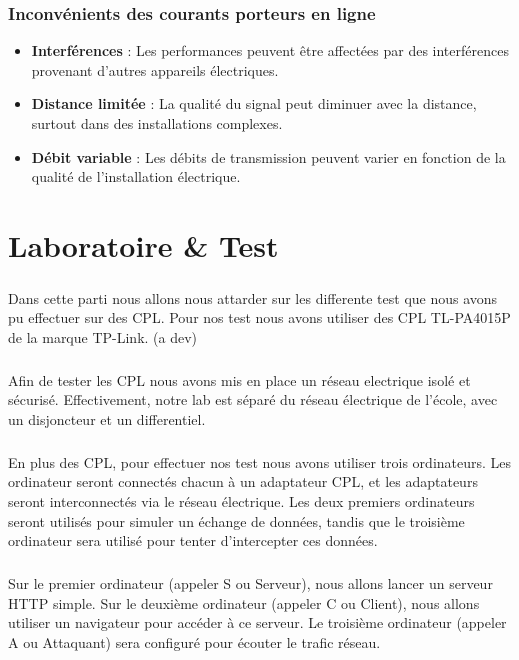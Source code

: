 \documentclass[a4paper,twocolumn]{report}
\begin{document}
\subsection{Inconvénients des courants porteurs en ligne}
\begin{itemize}
    \item \textbf{Interférences} : Les performances peuvent être affectées par des interférences provenant d'autres appareils électriques.
    \item \textbf{Distance limitée} : La qualité du signal peut diminuer avec la distance, surtout dans des installations complexes.
    \item \textbf{Débit variable} : Les débits de transmission peuvent varier en fonction de la qualité de l'installation électrique.
\end{itemize}



\chapter{Laboratoire & Test}
\paragraph{}Dans cette parti nous allons nous attarder sur les differente test que nous avons pu effectuer sur des CPL. Pour nos test nous avons utiliser des CPL TL-PA4015P de la marque TP-Link. (a dev)
\paragraph{}Afin de tester les CPL nous avons mis en place un réseau electrique isolé et sécurisé. Effectivement, notre lab est séparé du réseau électrique de l'école, avec un disjoncteur et un differentiel.
\paragraph{}En plus des CPL, pour effectuer nos test nous avons utiliser trois ordinateurs. Les ordinateur seront connectés chacun à un adaptateur CPL, et les adaptateurs seront interconnectés via le réseau électrique. Les deux premiers ordinateurs seront utilisés pour simuler un échange de données, tandis que le troisième ordinateur sera utilisé pour tenter d'intercepter ces données.
\paragraph{}Sur le premier ordinateur (appeler S ou Serveur), nous allons lancer un serveur HTTP simple. Sur le deuxième ordinateur (appeler C ou Client), nous allons utiliser un navigateur pour accéder à ce serveur. Le troisième ordinateur (appeler A ou Attaquant) sera configuré pour écouter le trafic réseau.
\end{document}

